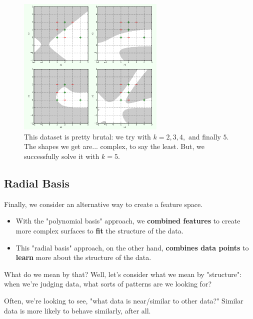              \begin{figure}[H]
                \centering
                
                \includegraphics[width=70mm,scale=0.5]{images/feature_images/harder_dataset.png}
                \caption*{This dataset is pretty brutal: we try with $k=2,3,4,$ and finally $5$. The shapes we get are... complex, to say the least. But, we successfully solve it with $k=5$.}
            \end{figure}

        \subsecdiv
        \subsection{Radial Basis}

            Finally, we consider an alternative way to create a feature space.

            \begin{itemize}
                \item With the "polynomial basis" approach, we \textbf{combined features} to create more complex surfaces to \textbf{fit} the structure of the data.
                
                \item This "radial basis" approach, on the other hand, \textbf{combines data points} to \textbf{learn} more about the structure of the data.
            \end{itemize}

            What do we mean by that? Well, let's consider what we mean by "structure": when we're judging data, what sorts of patterns are we looking for?

            Often, we're looking to see, "what data is near/similar to other data?" Similar data is more likely to behave similarly, after all.

